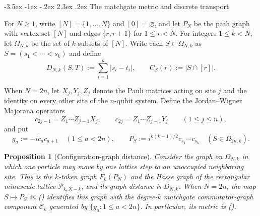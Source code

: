 \documentclass[twoside,10pt]{article}
\makeatletter
\numberwithin{equation}{section}
\theoremstyle{slbody}
\newtheorem{proposition}[theorem]{Proposition}
\theoremstyle{definition}
\theoremstyle{remark}
\newcommand{\1}{\mathbf{1}}
\renewcommand{\section}{%
  \@startsection{section}{1}{\z@}%
    {-3.5ex \@plus -1ex \@minus -.2ex}%
    {2.3ex \@plus .2ex}%
    {\normalfont\large\bfseries}}
\renewcommand{\eqref}[1]{%
  \textup{{\normalfont(\oldstylenums{\ref{#1}}}\normalfont)}}
\makeatother
\begin{document}
\section{The matchgate metric and discrete transport}

For $N\geq1$, write $[N]=\{1,\ldots,N\}$ and $[0]=\varnothing$, and let
$P_N$ be the path graph with vertex set $[N]$ and edges
$\{r,r+1\}$ for $1\leq r<N$.  For integers $1\leq k<N$, let
$\Omega_{N,k}$ be the set of $k$-subsets of $[N]$.  Write each
$S\in\Omega_{N,k}$ as
$S=(s_1<\cdots<s_k)$ and define
\[
 D_{N,k}(S,T):=\sum_{i=1}^k|s_i-t_i|,
 \qquad
 C_S(r):=|S\cap[r]|.
\]

When $N=2n$, let $X_j,Y_j,Z_j$ denote the Pauli matrices acting on site $j$
and the identity on every other site of the $n$-qubit system.  Define the
Jordan--Wigner Majorana operators
\[
 c_{2j-1}=Z_1\cdots Z_{j-1}X_j,\qquad
 c_{2j}=Z_1\cdots Z_{j-1}Y_j\qquad(1\leq j\leq n),
\]
and put
\begin{equation}\label{eq:majorana-support-convention}
 g_a:=-ic_ac_{a+1}\quad(1\leq a<2n),
 \qquad
 P_S:=i^{k(k-1)/2}c_{s_1}\cdots c_{s_k}
 \quad(S\in\Omega_{2n,k}).
\end{equation}

\begin{proposition}[Configuration-graph distance]\label{prop:graph-metric}
Consider the graph on $\Omega_{N,k}$ in which one particle may move by one
lattice step to an unoccupied neighboring site.  This is the $k$-token graph
$F_k(P_N)$ and the Hasse graph of the rectangular minuscule lattice
$\mathcal P_{k,N-k}$, and its graph distance is $D_{N,k}$.  When $N=2n$, the
map $S\mapsto P_S$ in \eqref{eq:majorana-support-convention} identifies this
graph with the degree-$k$ matchgate commutator-graph component
$\mathcal C_k$ generated by $\{g_a:1\leq a<2n\}$.  In particular, its metric
is \eqref{eq:matching-distance}.
\end{proposition}
\end{document}
